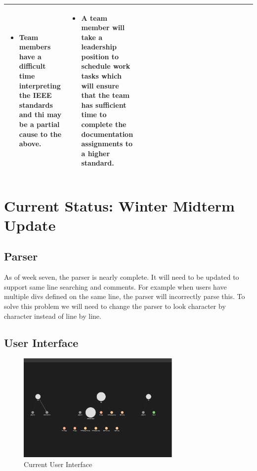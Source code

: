\documentclass[letterpaper,10pt,titlepage,draftclsnofoot,onecolumn,onesided] {IEEEtran}
\begin{document}
\begin{center}
\begin{singlespace}
\begin{tabular}{ |  p{0.25\linewidth}  |  p{0.25\linewidth}  | p{0.25\linewidth} | p{0.25\linewidth} |}
\begin{itemize}
				\item Team members have a difficult time interpreting the IEEE standards and thi may be a partial cause to the above.
			\end{itemize}
		&
			\begin{itemize}
				\item A team member will take a leadership position to schedule work tasks which will ensure that the team has sufficient time to complete the documentation assignments to a higher standard. 
			\end{itemize} 
		\\ \hline
		\end{tabular}
		\end{singlespace}
	\end{center}

\section{Current Status: Winter Midterm Update}

	\subsection{Parser}
	As of week seven, the parser is nearly complete.
	It will need to be updated to support same line searching and comments.
	For example when users have multiple divs defined on the same line, the parser will incorrectly parse this.
	To solve this problem we will need to change the parser to look character by character instead of line by line.
	

	\subsection{User Interface}

	\begin{figure}
		\includegraphics[width=300px]{capstoneUI1}
		\caption{Current User Interface}
	\end{figure}
\end{document}
